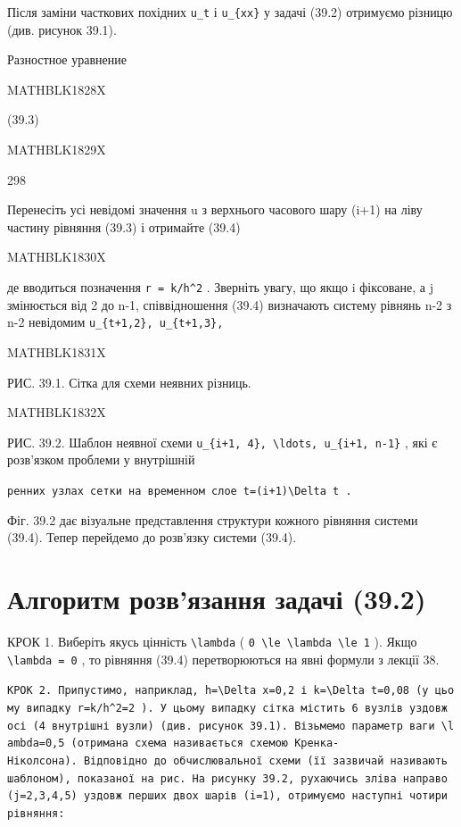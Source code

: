 \documentclass[
  ukrainian,
]{article}
\begin{document}
Після заміни часткових похідних \texttt{u\_t} і \texttt{u\_\{xx\}} у
задачі (39.2) отримуємо різницю (див. рисунок 39.1).

Разностное уравнение

MATHBLK1828X

(39.3)

MATHBLK1829X

298

Перенесіть усі невідомі значення u з верхнього часового шару (i+1) на
ліву частину рівняння (39.3) і отримайте (39.4)

MATHBLK1830X

де вводиться позначення \texttt{r\ =\ k/h\^{}2} . Зверніть увагу, що
якщо i фіксоване, а j змінюється від 2 до n-1, співвідношення (39.4)
визначають систему рівнянь n-2 з n-2 невідомим
\texttt{u\_\{t+1,2\},\ u\_\{t+1,3\},}

MATHBLK1831X

РИС. 39.1. Сітка для схеми неявних різниць.

MATHBLK1832X

РИС. 39.2. Шаблон неявної схеми
\texttt{u\_\{i+1,\ 4\},\ \textbackslash{}ldots,\ u\_\{i+1,\ n-1\}} , які
є розв'язком проблеми у внутрішній

\texttt{ренних\ узлах\ сетки\ на\ временном\ слое\ \textquotesingle{}t=(i+1)\textbackslash{}Delta\ t\textquotesingle{}\ .}

Фіг. 39.2 дає візуальне представлення структури кожного рівняння системи
(39.4). Тепер перейдемо до розв'язку системи (39.4).

\section{Алгоритм розв'язання задачі
(39.2)}\label{ux430ux43bux433ux43eux440ux438ux442ux43c-ux440ux43eux437ux432ux44fux437ux430ux43dux43dux44f-ux437ux430ux434ux430ux447ux456-39.2}

КРОК 1. Виберіть якусь цінність \texttt{\textbackslash{}lambda} (
\texttt{0\ \textbackslash{}le\ \textbackslash{}lambda\ \textbackslash{}le\ 1}
). Якщо \texttt{\textbackslash{}lambda\ =\ 0} , то рівняння (39.4)
перетворюються на явні формули з лекції 38.

\texttt{КРОК\ 2.\ Припустимо,\ наприклад,\ \textquotesingle{}h=\textbackslash{}Delta\ x=0,2\textquotesingle{}\ і\ \textquotesingle{}k=\textbackslash{}Delta\ t=0,08\textquotesingle{}\ (у\ цьому\ випадку\ \textquotesingle{}r=k/h\^{}2=2\textquotesingle{}\ ).\ У\ цьому\ випадку\ сітка\ містить\ 6\ вузлів\ уздовж\ осі\ (4\ внутрішні\ вузли)\ (див.\ рисунок\ 39.1).\ Візьмемо\ параметр\ ваги\ \textquotesingle{}\textbackslash{}lambda=0,5\textquotesingle{}\ (отримана\ схема\ називається\ схемою\ Кренка-Ніколсона).\ Відповідно\ до\ обчислювальної\ схеми\ (її\ зазвичай\ називають\ шаблоном),\ показаної\ на\ рис.\ На\ рисунку\ 39.2,\ рухаючись\ зліва\ направо\ (j=2,3,4,5)\ уздовж\ перших\ двох\ шарів\ (i=1),\ отримуємо\ наступні\ чотири\ рівняння:}
\end{document}
